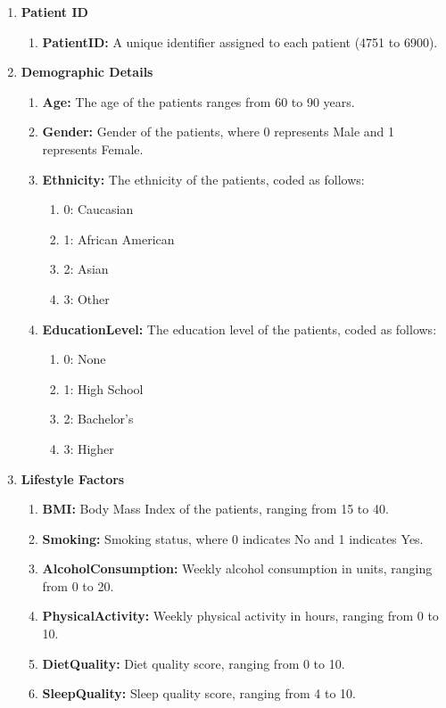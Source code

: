 \documentclass[a4paper,12pt]{report}
\begin{document}
\begin {enumerate}
\item\textbf{Patient ID}
\begin {enumerate}[label=\roman*]
\item\textbf{PatientID:} A unique identifier assigned to each patient (4751 to 6900).
\end {enumerate}
\item\textbf{Demographic Details}
\begin {enumerate}[label=\roman*]
    \item \textbf{Age:} The age of the patients ranges from 60 to 90 years.
    \item \textbf{Gender:} Gender of the patients, where 0 represents Male and 1 represents Female.
    \item \textbf{Ethnicity:} The ethnicity of the patients, coded as follows:
\begin {enumerate}[label=\alph*]
        \item 0: Caucasian
        \item 1: African American
        \item 2: Asian
        \item 3: Other
\end{enumerate}
    \item \textbf{EducationLevel:} The education level of the patients, coded as follows:
    \begin {enumerate}[label=\alph*]
        \item 0: None
        \item 1: High School
        \item 2: Bachelor's
        \item 3: Higher
     \end{enumerate}
\end{enumerate}

\item\textbf{Lifestyle Factors}
\begin {enumerate}[label=\roman*]
    \item \textbf{BMI:} Body Mass Index of the patients, ranging from 15 to 40.
    \item \textbf{Smoking:} Smoking status, where 0 indicates No and 1 indicates Yes.
    \item \textbf{AlcoholConsumption:} Weekly alcohol consumption in units, ranging from 0 to 20.
    \item \textbf{PhysicalActivity:} Weekly physical activity in hours, ranging from 0 to 10.
    \item \textbf{DietQuality:} Diet quality score, ranging from 0 to 10.
    \item \textbf{SleepQuality:} Sleep quality score, ranging from 4 to 10.
\end{enumerate}


\end{enumerate}
\end{document}
